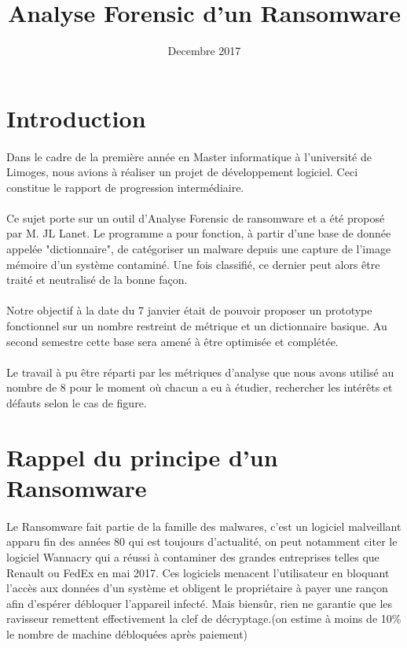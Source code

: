 \documentclass[a4paper, 12pt, twoside]{article}
\author{}
\title{Analyse Forensic d'un Ransomware}
\date{Decembre 2017}
\begin{document}
\pagedegarde
\tableofcontents
\newpage
\section{Introduction}
\paragraph{}

Dans le cadre de la première année en Master informatique à l'université de Limoges, nous avions à réaliser un projet de développement logiciel. Ceci constitue le rapport de progression intermédiaire.

\paragraph{}
Ce sujet porte sur un outil d'Analyse Forensic de ransomware et a été proposé par M. JL Lanet. Le programme a pour fonction, à partir d'une base de donnée appelée "dictionnaire", de catégoriser un malware depuis une capture de l'image mémoire d'un système contaminé. Une fois classifié, ce dernier peut alors être traité et neutralisé de la bonne façon.

\paragraph{}
 Notre objectif à la date du 7 janvier était de pouvoir proposer un prototype fonctionnel sur un nombre restreint de métrique et un dictionnaire basique. Au second semestre cette base sera amené à être optimisée et complétée.

\paragraph{}
Le travail à pu être réparti par les métriques d'analyse que nous avons utilisé au nombre de 8 pour le moment où chacun a eu à étudier, rechercher les intérêts et défauts selon le cas de figure.




\newpage
\section{Rappel du principe d'un Ransomware}

\paragraph{}
Le Ransomware fait partie de la famille des malwares, c'est un logiciel malveillant apparu fin des années 80 qui est toujours d'actualité, on peut notamment citer le logiciel Wannacry qui a réussi à contaminer des grandes entreprises telles que Renault ou FedEx en mai 2017. Ces logiciels menacent l'utilisateur en bloquant l'accès aux données d'un système et obligent le propriétaire à payer une rançon afin d'espérer débloquer l'appareil infecté. Mais biensûr, rien ne garantie que les ravisseur remettent effectivement la clef de décryptage.(on estime à moins de 10\% le nombre de machine débloquées après paiement) 
\end{document}
